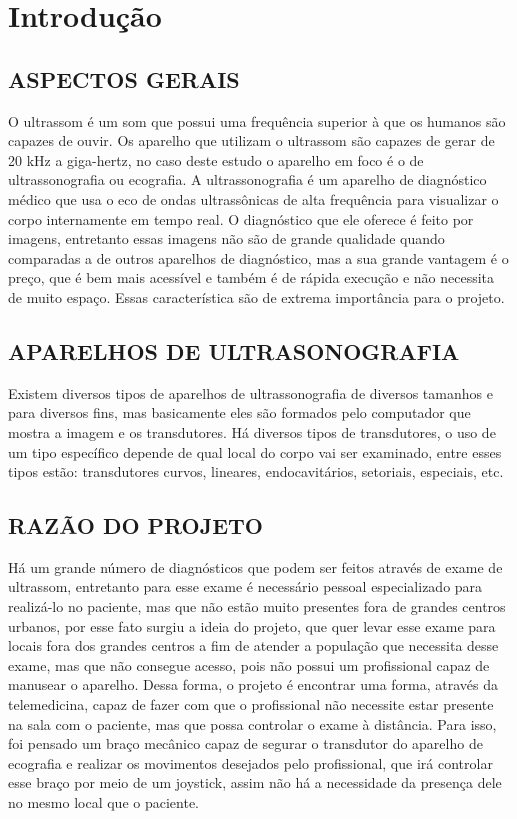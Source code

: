 \chapter{Introdução}

\section{ASPECTOS GERAIS}
O ultrassom é um som que possui uma frequência superior à que os humanos são capazes de ouvir. Os aparelho que utilizam o ultrassom são capazes de gerar de 20 kHz a giga-hertz, no caso deste estudo o aparelho em foco é o de ultrassonografia ou ecografia.
A ultrassonografia é um aparelho de diagnóstico médico que usa o eco de ondas ultrassônicas de alta frequência para visualizar o corpo internamente em tempo real. O diagnóstico que ele oferece é feito por imagens, entretanto essas imagens não são de grande qualidade quando comparadas a de outros aparelhos de diagnóstico, mas a sua grande vantagem é o preço, que é bem mais acessível e também é de rápida execução e não necessita de muito espaço. Essas característica são de extrema importância para o projeto.

\section{APARELHOS DE ULTRASONOGRAFIA}
Existem diversos tipos de aparelhos de ultrassonografia de diversos tamanhos e para diversos fins, mas basicamente eles são formados pelo computador que mostra a imagem e os transdutores. Há diversos tipos de transdutores, o uso de um tipo específico depende de qual local do corpo vai ser examinado, entre esses tipos estão: transdutores curvos, lineares, endocavitários, setoriais, especiais, etc. 

\section{RAZÃO DO PROJETO}
Há um grande número de diagnósticos que podem ser feitos através de exame de ultrassom, entretanto para esse exame é necessário pessoal especializado para realizá-lo no paciente, mas que não estão muito presentes fora de grandes centros urbanos, por esse fato surgiu a ideia do projeto, que quer levar esse exame para locais fora dos grandes centros a fim de atender a população que necessita desse exame, mas que não consegue acesso, pois não possui um profissional capaz de manusear o aparelho. Dessa forma, o projeto é encontrar uma forma, através da telemedicina, capaz de fazer com que o profissional não necessite estar presente na sala com o paciente, mas que possa controlar o exame à distância. Para isso, foi pensado um braço mecânico capaz de segurar o transdutor do aparelho de ecografia e realizar os movimentos desejados pelo profissional, que irá controlar esse braço por meio de um joystick, assim não há a necessidade da presença dele no mesmo local que o paciente.